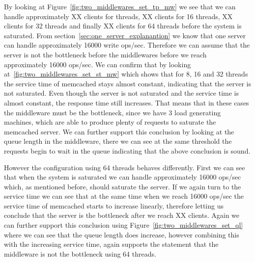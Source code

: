 \documentclass[11pt,a4paper]{article}
\begin{document}
%
By looking at Figure~\ref{fig:two_middlewares_set_tp_mw} we see that we can handle approximately XX clients for  threads, XX clients for 16 threads, XX clients for 32 threads and finally XX clients for 64 threads before the system is saturated.
%
From section~\ref{sec:one_server_explanantion} we know that one server can handle approximately 16000 write ops/sec.
%
Therefore we can assume that the server is not the bottleneck before the middlewares before we reach approximately 16000 ops/sec.
%
We can confirm that by looking at~\ref{fig:two_middlewares_set_st_mw} which shows that for 8, 16 and 32 threads the service time of memcached stays almost constant, indicating that the server is not saturated. 
%
Even though the server is not saturated and the service time is almost constant, the response time still increases.
%
That means that in these cases the middleware must be the bottleneck, since we have 3 load generating machines, which are able to produce plenty of requests to saturate the memcached server.
%
We can further support this conclusion by looking at the queue length in the middleware, there we can see at the same threshold the requests begin to wait in the queue indicating that the above conclusion is sound.
%
\par
%
However the configuration using 64 threads behaves differently.
%
First we can see that when the system is saturated we can handle approximately 16000 ops/sec which, as mentioned before, should saturate the server.
%
If we again turn to the service time we can see that at the same time when we reach 16000 ops/sec the service time of memcached starts to increase linearly, therefore letting us conclude that the server is the bottleneck after we reach XX clients.
%
Again we can further support this conclusion using Figure~\ref{fig:two_middlewares_set_ql} where we can see that the queue length  does increase, however combining this with the increasing service time, again supports the statement that the middleware is not the bottleneck using 64 threads.
%
\end{document}
